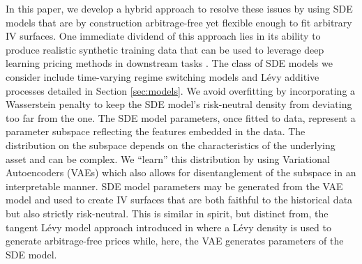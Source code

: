 \documentclass[onefignum,onetabnum]{siamonline190516}
\begin{document}
In this paper, we develop a hybrid approach to resolve these issues by using SDE models that are by construction arbitrage-free yet flexible enough to fit arbitrary IV surfaces.  One immediate dividend of this approach lies in its ability to produce realistic synthetic training data that can be used to leverage deep learning pricing methods in downstream tasks \cite{ferguson2018deeply,horvath2019deep}. The class of SDE models we consider include time-varying regime switching models and L\'evy additive processes detailed in Section \ref{sec:models}. We avoid overfitting by incorporating a Wasserstein penalty to keep the SDE model's risk-neutral density from deviating too far from the  one. The SDE model parameters, once fitted to data, represent a parameter subspace reflecting the features embedded in the data. The distribution on the subspace depends on the characteristics of the underlying asset and can be complex. We ``learn'' this distribution by using Variational Autoencoders (VAEs) which also allows for disentanglement of the subspace in an interpretable manner. SDE model parameters may be generated from the VAE model and used to create IV surfaces that are both faithful to the historical data but also strictly risk-neutral. This is similar in spirit, but distinct from, the tangent L\'evy model approach introduced in \cite{carmona2012tangent} where a L\'evy density is used to generate arbitrage-free prices while, here, the VAE generates parameters of the SDE model.

\end{document}
